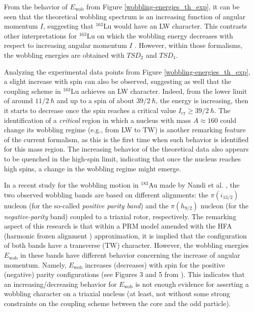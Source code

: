\documentclass[myclassdoc,debug]{rjparticle}
\begin{document}
From the behavior of $E_\text{wob}$ from Figure \ref{wobbling-energies_th_exp}, it can be seen that the theoretical wobbling spectrum is an increasing function of angular momentum $I$, suggesting that $^{163}$Lu would have an LW character. This contrasts other interpretations for $^{163}$Lu on which the wobbling energy decreases with respect to increasing angular momentum $I$  \cite{frauendorf2014transverse,frauendorf2018comment, tanabe2018reply}. However, within those formalisms, the wobbling energies are obtained with $TSD_2$ and $TSD_1$.

Analyzing the experimental data points from Figure \ref{wobbling-energies_th_exp}, a slight increase with spin can also be observed, suggesting as well that the coupling scheme in $^{163}$Lu achieves an LW character. Indeed, from the lower limit of around $11/2\ \hbar$ and up to a spin of about $39/2\ \hbar$, the energy is increasing, then it starts to decrease once the spin reaches a critical value $I_\text{cr}\geq39/2\ \hbar$. The identification of a \emph{critical} region in which a nucleus with mass $A\approx160$ could change its wobbling regime (e.g., from LW to TW) is another remarking feature of the current formalism, as this is the first time when such behavior is identified for this mass region. The increasing behavior of the theoretical data also appears to be quenched in the high-spin limit, indicating that once the nucleus reaches high spins, a change in the wobbling regime might emerge.

In a recent study for the wobbling motion in $^{183}$Au made by Nandi et al. \cite{nandi2020first}, the two observed wobbling bands are based on different alignments: the $\pi(i_{13/2})$ nucleon (for the so-called \emph{positive parity band}) and the $\pi(h_{9/2})$ nucleon (for the \emph{negative-parity} band) coupled to a triaxial rotor, respectively. The remarking aspect of this research is that within a PRM model amended with the HFA (harmonic frozen alignment \cite{frauendorf2014transverse}) approximation, it is implied that the configuration of both bands have a transverse (TW) character. However, the wobbling energies $E_\text{wob}$ in these bands have different behavior concerning the increase of angular momentum. Namely, $E_\text{wob}$ increases (decreases) with spin for the positive (negative) parity configurations (see Figures 3 and 5 from \cite{nandi2020first}). This indicates that an increasing/decreasing behavior for $E_\text{wob}$ is not enough evidence for asserting a wobbling character on a triaxial nucleus (at least, not without some strong constraints on the coupling scheme between the core and the odd particle).
\end{document}
